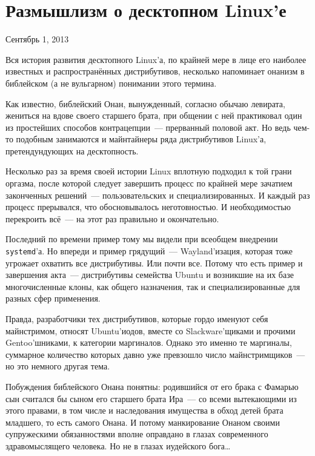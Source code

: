 \section{Размышлизм о десктопном Linux’е} 
\begin{timeline}Сентябрь 1, 2013\end{timeline}

Вся история развития десктопного Linux'а, по крайней мере в лице его наиболее известных и распространённых дистрибутивов, несколько напоминает онанизм в библейском (а не вульгарном) понимании этого термина.

Как известно, библейский Онан, вынужденный, согласно обычаю левирата, жениться на вдове своего старшего брата, при общении с ней практиковал один из простейших способов контрацепции~--- прерванный половой акт. Но ведь чем-то подобным занимаются и майнтайнеры ряда дистрибутивов Linux'а, претендундующих на десктопность.

Несколько раз за время своей истории Linux вплотную подходил к той грани оргазма, после которой следует завершить процесс по крайней мере зачатием законченных решений~--- пользовательских и специализированных. И каждый раз процесс прерывался, что обосновывалось неготовностью. И необходимостью перекроить всё~--- на этот раз правильно и окончательно.

Последний по времени пример тому мы видели при всеобщем внедрении \texttt{systemd}'а. Но впереди и пример грядущий~--- Wayland'изация, которая тоже угрожает охватить все дистрибутивы. Или почти все. Потому что есть пример и завершения акта~--- дистрибутивы семейства Ubuntu и возникшие на их базе многочисленные клоны, как общего назначения, так и специализированные для разных сфер применения.

Правда, разработчики тех дистрибутивов, которые гордо именуют себя майнстримом, относят Ubuntu'иодов, вместе со Slackware'щиками и прочими Gentoo'шниками, к категории маргиналов. Однако это именно те маргиналы, суммарное количество которых давно уже превзошло число майнстримщиков~--- но это немного другая тема.

Побуждения библейского Онана понятны: родившийся от его брака с Фамарью сын считался бы сыном его старшего брата Ира~--- со всеми вытекающими из этого правами, в том числе и наследования имущества в обход детей брата младшего, то есть самого Онана. И потому манкирование Онаном своими супружескими обязанностями вполне оправдано в глазах современного здравомыслящего человека. Но не в глазах иудейского бога\dots

